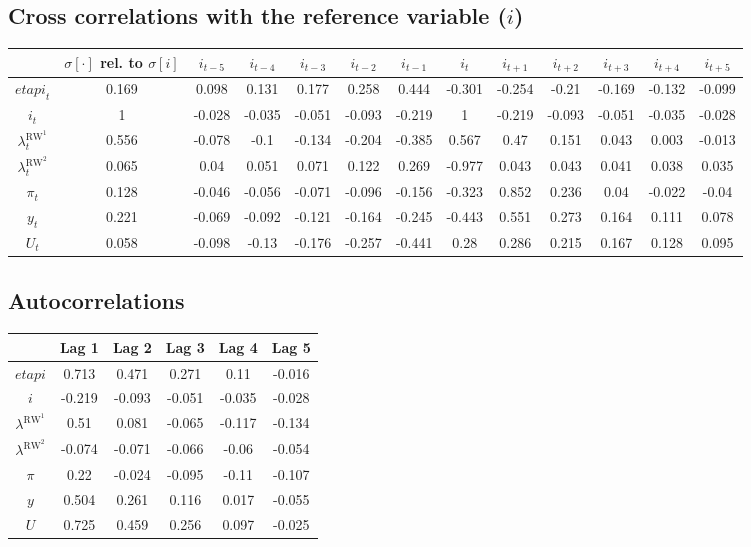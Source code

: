 \subsection{Cross correlations with the reference variable ($i$)}

\begin{tabular}{c|c|c|c|c|c|c|c|c|c|c|c|c|}
  & $\sigma[\cdot]$ rel. to $\sigma[i]$ & $i_{t-5}$ & $i_{t-4}$ & $i_{t-3}$ & $i_{t-2}$ & $i_{t-1}$ & $i_{t}$ & $i_{t+1}$ & $i_{t+2}$ & $i_{t+3}$ & $i_{t+4}$ & $i_{t+5}$\\
\hline
${e\!t\!a\!p\!i}_{t}$ & 0.169 & 0.098 & 0.131 & 0.177 & 0.258 & 0.444 & -0.301 & -0.254 & -0.21 & -0.169 & -0.132 & -0.099 \\
$i_{t}$ & 1 & -0.028 & -0.035 & -0.051 & -0.093 & -0.219 & 1 & -0.219 & -0.093 & -0.051 & -0.035 & -0.028 \\
$\lambda^{\mathrm{RW}^{\mathrm{1}}}_{t}$ & 0.556 & -0.078 & -0.1 & -0.134 & -0.204 & -0.385 & 0.567 & 0.47 & 0.151 & 0.043 & 0.003 & -0.013 \\
$\lambda^{\mathrm{RW}^{\mathrm{2}}}_{t}$ & 0.065 & 0.04 & 0.051 & 0.071 & 0.122 & 0.269 & -0.977 & 0.043 & 0.043 & 0.041 & 0.038 & 0.035 \\
$\pi_{t}$ & 0.128 & -0.046 & -0.056 & -0.071 & -0.096 & -0.156 & -0.323 & 0.852 & 0.236 & 0.04 & -0.022 & -0.04 \\
$y_{t}$ & 0.221 & -0.069 & -0.092 & -0.121 & -0.164 & -0.245 & -0.443 & 0.551 & 0.273 & 0.164 & 0.111 & 0.078 \\
$U_{t}$ & 0.058 & -0.098 & -0.13 & -0.176 & -0.257 & -0.441 & 0.28 & 0.286 & 0.215 & 0.167 & 0.128 & 0.095 \\
\hline
\end{tabular}


\subsection{Autocorrelations}

\begin{tabular}{c|ccccc|}
  & Lag 1 & Lag 2 & Lag 3 & Lag 4 & Lag 5\\
\hline
${e\!t\!a\!p\!i}$ & 0.713 & 0.471 & 0.271 & 0.11 & -0.016 \\
$i$ & -0.219 & -0.093 & -0.051 & -0.035 & -0.028 \\
$\lambda^{\mathrm{RW}^{\mathrm{1}}}$ & 0.51 & 0.081 & -0.065 & -0.117 & -0.134 \\
$\lambda^{\mathrm{RW}^{\mathrm{2}}}$ & -0.074 & -0.071 & -0.066 & -0.06 & -0.054 \\
$\pi$ & 0.22 & -0.024 & -0.095 & -0.11 & -0.107 \\
$y$ & 0.504 & 0.261 & 0.116 & 0.017 & -0.055 \\
$U$ & 0.725 & 0.459 & 0.256 & 0.097 & -0.025 \\
\hline
\end{tabular}




